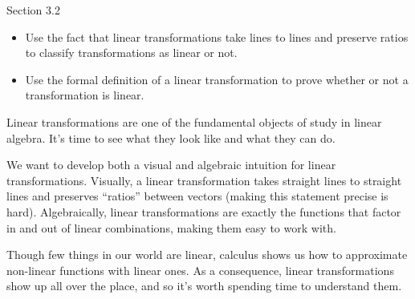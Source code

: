 \begin{lesson}

	Section 3.2

	\begin{itemize}
		\item Use the fact that linear transformations take lines to lines and preserve
			ratios to classify transformations as linear or not.
		\item Use the formal definition of a linear transformation to prove whether or not a
			transformation is linear.
	\end{itemize}

		Linear transformations are one of the fundamental objects of study in linear algebra.
		It's time to see what they look like and what they can do.

		We want to develop both a visual and algebraic intuition for linear transformations.
		Visually, a linear transformation takes straight lines to straight lines and preserves ``ratios'' between
		vectors (making this statement precise is hard). Algebraically, linear transformations are exactly
		the functions that factor in and out of linear combinations, making them easy to work with.

		Though few things in our world are linear, calculus shows us how to approximate
		non-linear functions with linear ones. As a consequence, linear transformations show
		up all over the place, and so it's worth spending time to understand them.
\end{lesson}


